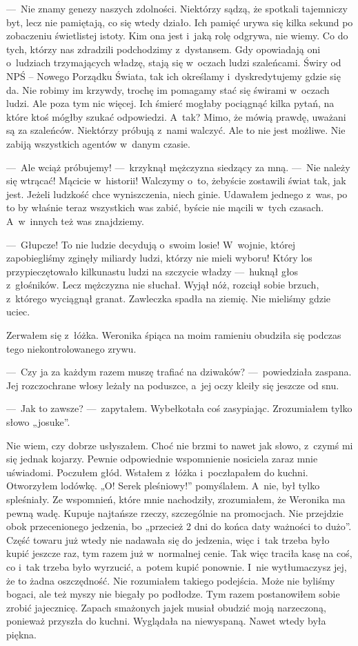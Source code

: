 ---~Nie znamy genezy naszych zdolności. Niektórzy sądzą, że spotkali tajemniczy byt, lecz nie pamiętają, co się wtedy 
działo. Ich pamięć urywa się kilka sekund po zobaczeniu świetlistej istoty. Kim ona jest i~jaką rolę odgrywa, nie 
wiemy. Co do tych, którzy nas zdradzili podchodzimy z~dystansem. Gdy opowiadają oni o~ludziach trzymających władzę, 
stają się w~oczach ludzi szaleńcami. Świry od NPŚ -- Nowego Porządku Świata, tak ich określamy i~dyskredytujemy gdzie 
się da. Nie robimy im krzywdy, trochę im pomagamy stać się świrami w~oczach ludzi. Ale poza tym nic więcej. Ich 
śmierć mogłaby pociągnąć kilka pytań, na które ktoś mógłby szukać odpowiedzi. A~tak? Mimo, że mówią prawdę, uważani 
są za szaleńców. Niektórzy próbują z~nami walczyć. Ale to nie jest możliwe. Nie zabiją wszystkich agentów w~danym 
czasie.

---~Ale wciąż próbujemy! ---~krzyknął mężczyzna siedzący za mną. ---~Nie należy się wtrącać! Mącicie w~historii! 
Walczymy o~to, żebyście zostawili świat tak, jak jest. Jeżeli ludzkość chce wyniszczenia, niech ginie. Udawałem 
jednego z~was, po to by właśnie teraz wszystkich was zabić, byście nie mącili w~tych czasach. A~w~innych też was 
znajdziemy.

---~Głupcze! To nie ludzie decydują o~swoim losie! W~wojnie, której zapobiegliśmy zginęły miliardy ludzi, którzy nie 
mieli wyboru! Który los przypieczętowało kilkunastu ludzi na szczycie władzy ---~huknął głos z~głośników. Lecz 
mężczyzna nie słuchał. Wyjął nóż, rozciął sobie brzuch, z~którego wyciągnął granat. Zawleczka spadła na ziemię. Nie 
mieliśmy gdzie uciec.

Zerwałem się z~łóżka. Weronika śpiąca na moim ramieniu obudziła się podczas tego niekontrolowanego zrywu.

---~Czy ja za każdym razem muszę trafiać na dziwaków? ---~powiedziała zaspana. Jej rozczochrane włosy leżały na 
poduszce, a~jej oczy kleiły się jeszcze od snu.

---~Jak to zawsze? ---~zapytałem. Wybełkotała coś zasypiając. Zrozumiałem tylko słowo „josuke”.

Nie wiem, czy dobrze usłyszałem. Choć nie brzmi to nawet jak słowo, z~czymś mi się jednak kojarzy. Pewnie odpowiednie 
wspomnienie nosiciela zaraz mnie uświadomi. Poczułem głód. Wstałem z~łóżka i~poczłapałem do kuchni. Otworzyłem 
lodówkę. „O! Serek pleśniowy!” pomyślałem. A~nie, był tylko spleśniały. Ze wspomnień, które mnie nachodziły, 
zrozumiałem, że Weronika ma pewną wadę. Kupuje najtańsze rzeczy, szczególnie na promocjach. Nie przejdzie obok 
przecenionego jedzenia, bo „przecież 2 dni do końca daty ważności to dużo”. Część towaru już wtedy nie nadawała się 
do jedzenia, więc i~tak trzeba było kupić jeszcze raz, tym razem już w~normalnej cenie. Tak więc traciła kasę na coś, 
co i~tak trzeba było wyrzucić, a~potem kupić ponownie. I~nie wytłumaczysz jej, że to żadna oszczędność. Nie 
rozumiałem takiego podejścia. Może nie byliśmy bogaci, ale też myszy nie biegały po podłodze. Tym razem postanowiłem 
sobie zrobić jajecznicę. Zapach smażonych jajek musiał obudzić moją narzeczoną, ponieważ przyszła do kuchni. 
Wyglądała na niewyspaną. Nawet wtedy była piękna.

